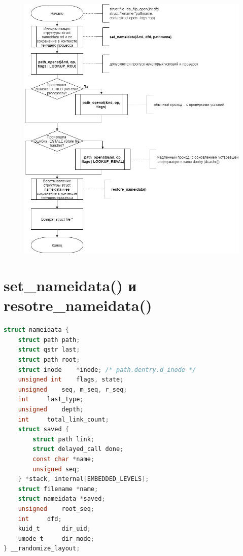\documentclass[a4paper,14pt]{extreport}
\begin{document}
\begin{figure}[H]
	\centering
	\includegraphics[scale=0.45]{img/do_filp_open.jpg}
	\label{fig:do_filp_open}
\end{figure}







\section{set\_nameidata() и resotre\_nameidata()}

\begin{lstlisting}[language=c, caption=Структура nameidata]
struct nameidata {
	struct path	path;
	struct qstr	last;
	struct path	root;
	struct inode	*inode; /* path.dentry.d_inode */
	unsigned int	flags, state;
	unsigned	seq, m_seq, r_seq;
	int		last_type;
	unsigned	depth;
	int		total_link_count;
	struct saved {
		struct path link;
		struct delayed_call done;
		const char *name;
		unsigned seq;
	} *stack, internal[EMBEDDED_LEVELS];
	struct filename	*name;
	struct nameidata *saved;
	unsigned	root_seq;
	int		dfd;
	kuid_t		dir_uid;
	umode_t		dir_mode;
} __randomize_layout;

\end{lstlisting}
\end{document}
